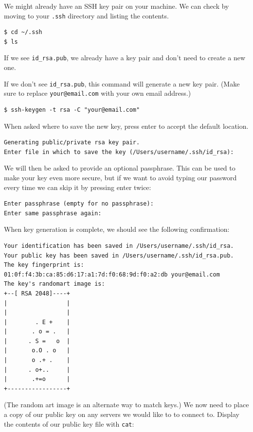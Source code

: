 \documentclass[
]{krantz}
\begin{document}
We might already have an SSH key pair on your machine.
We can check by moving to your \texttt{.ssh} directory and listing the contents.

\begin{verbatim}
$ cd ~/.ssh
$ ls
\end{verbatim}

If we see \texttt{id\_rsa.pub},
we already have a key pair and don't need to create a new one.

If we don't see \texttt{id\_rsa.pub},
this command will generate a new key pair.
(Make sure to replace \texttt{your@email.com} with your own email address.)

\begin{verbatim}
$ ssh-keygen -t rsa -C "your@email.com"
\end{verbatim}

When asked where to save the new key,
press enter to accept the default location.

\begin{verbatim}
Generating public/private rsa key pair.
Enter file in which to save the key (/Users/username/.ssh/id_rsa):
\end{verbatim}

We will then be asked to provide an optional passphrase.
This can be used to make your key even more secure,
but if we want to avoid typing our password every time
we can skip it by pressing enter twice:

\begin{verbatim}
Enter passphrase (empty for no passphrase):
Enter same passphrase again:
\end{verbatim}

When key generation is complete,
we should see the following confirmation:

\begin{verbatim}
Your identification has been saved in /Users/username/.ssh/id_rsa.
Your public key has been saved in /Users/username/.ssh/id_rsa.pub.
The key fingerprint is:
01:0f:f4:3b:ca:85:d6:17:a1:7d:f0:68:9d:f0:a2:db your@email.com
The key's randomart image is:
+--[ RSA 2048]----+
|                 |
|                 |
|        . E +    |
|       . o = .   |
|      . S =   o  |
|       o.O . o   |
|       o .+ .    |
|      . o+..     |
|       .+=o      |
+-----------------+
\end{verbatim}

(The random art image is an alternate way to match keys.)
We now need to place a copy of our public key on
any servers we would like to to connect to.
Display the contents of our public key file with \texttt{cat}:
\end{document}
